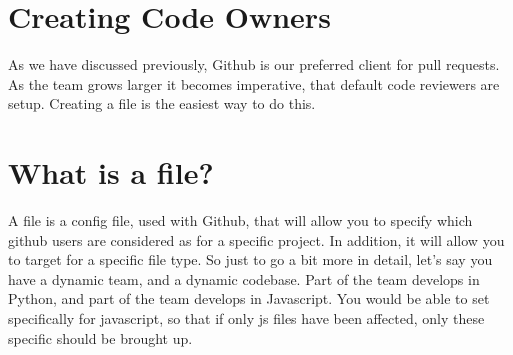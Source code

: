 \maketitle{}
\section{ Creating Code Owners }

As we have discussed previously, Github is our preferred client for pull
requests. As the team grows larger it becomes imperative, that default code
reviewers are setup. Creating a \codeowners{} file is the easiest way to do this.

\section{ What is a \codeowners{} file? }
A \codeowners{} file is a config file, used with Github, that will allow you to
specify which github users are considered as \codeowners{} for a specific project.
In addition, it will allow you to target \codeowners{} for a specific file type.
So just to go a bit more in detail, let's say you have a dynamic team, and a
dynamic codebase. Part of the team develops in Python, and part of the team
develops in Javascript. You would be able to set \codeowners{} specifically for
javascript, so that if only js files have been affected, only these specific
\codeowners{} should be brought up.
